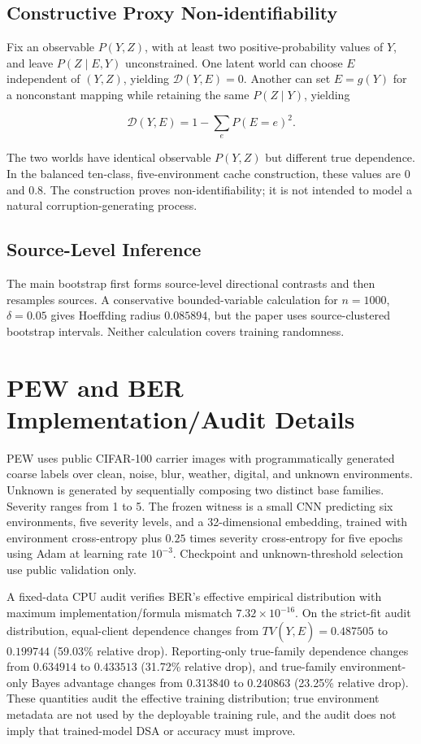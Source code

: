 \documentclass[10pt,twocolumn]{article}
\begin{document}
\subsection{Constructive Proxy Non-identifiability}

Fix an observable \(P(Y,Z)\), with at least two positive-probability values of \(Y\), and leave \(P(Z\mid E,Y)\) unconstrained. One latent world can choose \(E\) independent of \((Y,Z)\), yielding \(\mathcal D(Y,E)=0\). Another can set \(E=g(Y)\) for a nonconstant mapping while retaining the same \(P(Z\mid Y)\), yielding

\[
\mathcal D(Y,E)=1-\sum_eP(E=e)^2.
\]

The two worlds have identical observable \(P(Y,Z)\) but different true dependence. In the balanced ten-class, five-environment cache construction, these values are 0 and 0.8. The construction proves non-identifiability; it is not intended to model a natural corruption-generating process.

\subsection{Source-Level Inference}

The main bootstrap first forms source-level directional contrasts and then resamples sources. A conservative bounded-variable calculation for \(n=1000\), \(\delta=0.05\) gives Hoeffding radius \(0.085894\), but the paper uses source-clustered bootstrap intervals. Neither calculation covers training randomness.

\section{PEW and BER Implementation/Audit Details}

PEW uses public CIFAR-100 carrier images with programmatically generated coarse labels over clean, noise, blur, weather, digital, and unknown environments. Unknown is generated by sequentially composing two distinct base families. Severity ranges from 1 to 5. The frozen witness is a small CNN predicting six environments, five severity levels, and a 32-dimensional embedding, trained with environment cross-entropy plus \(0.25\) times severity cross-entropy for five epochs using Adam at learning rate \(10^{-3}\). Checkpoint and unknown-threshold selection use public validation only.

A fixed-data CPU audit verifies BER's effective empirical distribution with maximum implementation/formula mismatch \(7.32\times10^{-16}\). On the strict-fit audit distribution, equal-client dependence changes from \(TV(Y,\hat E)=0.487505\) to \(0.199744\) (59.03\% relative drop). Reporting-only true-family dependence changes from \(0.634914\) to \(0.433513\) (31.72\% relative drop), and true-family environment-only Bayes advantage changes from \(0.313840\) to \(0.240863\) (23.25\% relative drop). These quantities audit the effective training distribution; true environment metadata are not used by the deployable training rule, and the audit does not imply that trained-model DSA or accuracy must improve.
\end{document}

